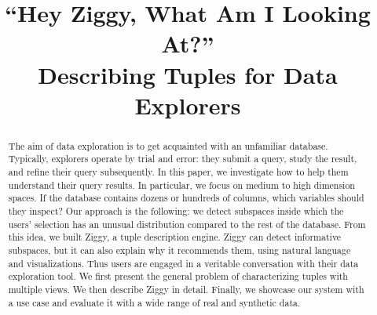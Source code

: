 \documentclass{sig-alternate-2013}
\begin{document}
\title{``Hey Ziggy, What Am I Looking At?''\\
Describing Tuples for Data Explorers}


\maketitle

\begin{abstract} 
The aim of data exploration is to get acquainted with an unfamiliar database.
Typically, explorers operate by trial and error: they submit a query, study the
result, and refine their query subsequently. In this paper, we investigate how
to help them understand their query results. In particular, we focus on medium
to high dimension spaces. If the database contains dozens or hundreds of
columns, which variables should they inspect? Our approach is the following: we
detect subspaces inside which the users' selection has an unusual distribution
compared to the rest of the database. From this idea, we built Ziggy, a tuple
description engine. Ziggy can detect informative subspaces, but it can also
explain why it recommends them, using natural language and visualizations. Thus
users are engaged in a veritable conversation with their data exploration tool.
We first present the general problem of characterizing tuples with multiple
views. We then describe Ziggy in detail. Finally, we showcase our system with a
use case and evaluate it with a wide range of real and synthetic data.
\end{abstract}






\balance

\end{document}
